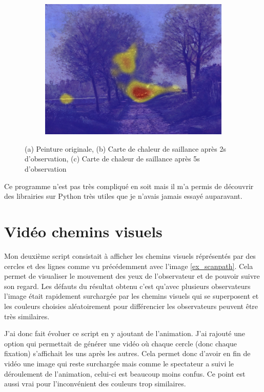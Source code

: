 \begin{figure}[!ht]
\begin{subfigure}{.3\textwidth}
        \includegraphics[width=\linewidth]{datas/fondu_05.jpg}
        \caption{}
    \end{subfigure}
    \caption{(a) Peinture originale, (b) Carte de chaleur de saillance après 2s d'observation, (c) Carte de chaleur de saillance après 5s d'observation}
    \label{fondu}
\end{figure}

\par
Ce programme n'est pas très compliqué en soit mais il m'a permis de découvrir des librairies sur Python très utiles que je n'avais jamais essayé auparavant.

\section{Vidéo chemins visuels}

Mon deuxième script consistait à afficher les chemins visuels réprésentés par des cercles et des lignes comme vu précédemment avec l'image \ref{ex_scanpath}. Cela permet de visualiser le mouvement des yeux de l'observateur et de pouvoir suivre son regard. Les défauts du résultat obtenu c'est qu'avec plusieurs observateurs l'image était rapidement surchargée par les chemins visuels qui se superposent et les couleurs choisies aléatoirement pour différencier les observateurs peuvent être très similaires.

\par
J'ai donc fait évoluer ce script en y ajoutant de l'animation. J'ai rajouté une option qui permettait de générer une vidéo où chaque cercle (donc chaque fixation) s'affichait les uns après les autres. Cela permet donc d'avoir en fin de vidéo une image qui reste surchargée mais comme le spectateur a suivi le déroulement de l'animation, celui-ci est beaucoup moins confus. Ce point est aussi vrai pour l'inconvénient des couleurs trop similaires.